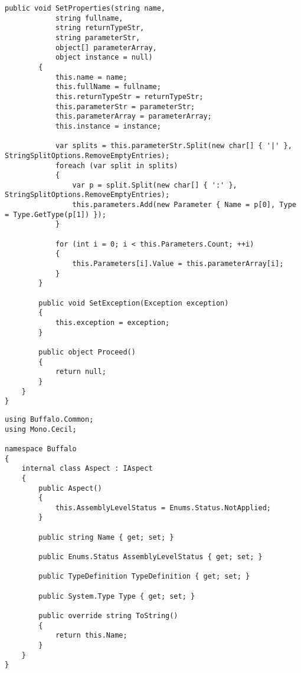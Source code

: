 \begin{lstlisting}[caption={../buffalo/MethodArgs.cs}, label=../buffalo/MethodArgs.cs, frame=tb, basicstyle=\scriptsize]
        public void SetProperties(string name,
            string fullname,
            string returnTypeStr,
            string parameterStr,
            object[] parameterArray,
            object instance = null)
        {
            this.name = name;
            this.fullName = fullname;
            this.returnTypeStr = returnTypeStr;
            this.parameterStr = parameterStr;
            this.parameterArray = parameterArray;
            this.instance = instance;

            var splits = this.parameterStr.Split(new char[] { '|' }, StringSplitOptions.RemoveEmptyEntries);
            foreach (var split in splits)
            {
                var p = split.Split(new char[] { ':' }, StringSplitOptions.RemoveEmptyEntries);
                this.parameters.Add(new Parameter { Name = p[0], Type = Type.GetType(p[1]) });
            }

            for (int i = 0; i < this.Parameters.Count; ++i)
            {
                this.Parameters[i].Value = this.parameterArray[i];
            }
        }

        public void SetException(Exception exception)
        {
            this.exception = exception;
        }

        public object Proceed()
        {
            return null;
        }
    }
}
\end{lstlisting}

\begin{lstlisting}[caption={../buffalo/Aspect.cs}, label=../buffalo/Aspect.cs, frame=tb, basicstyle=\scriptsize]﻿using Buffalo.Common;
using Mono.Cecil;

namespace Buffalo
{
    internal class Aspect : IAspect
    {
        public Aspect()
        {
            this.AssemblyLevelStatus = Enums.Status.NotApplied;
        }

        public string Name { get; set; }

        public Enums.Status AssemblyLevelStatus { get; set; }

        public TypeDefinition TypeDefinition { get; set; }

        public System.Type Type { get; set; }

        public override string ToString()
        {
            return this.Name;
        }
    }
}
\end{lstlisting}

